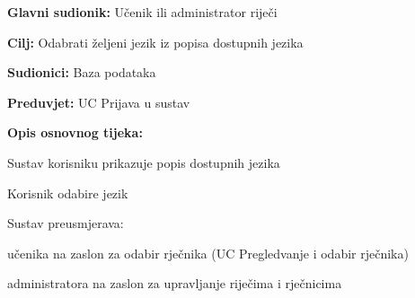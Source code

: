 \noindent {}
\begin{packed_item}

	\item \textbf{Glavni sudionik: } Učenik ili administrator riječi
	\item \textbf{Cilj: } Odabrati željeni jezik iz popisa dostupnih jezika
	\item \textbf{Sudionici: } Baza podataka
	\item \textbf{Preduvjet: } UC Prijava u sustav
	\item  \textbf{Opis osnovnog tijeka:}
	
	\item[] \begin{packed_enum}

		\item Sustav korisniku prikazuje popis dostupnih jezika
		\item Korisnik odabire jezik
		\item Sustav preusmjerava:
		
		\item[] \begin{packed_item}

			\item učenika na zaslon za odabir rječnika (UC Pregledvanje i odabir rječnika)
			\item administratora na zaslon za upravljanje riječima i rječnicima
		
		\end{packed_item}

	\end{packed_enum}
	
\end{packed_item}

